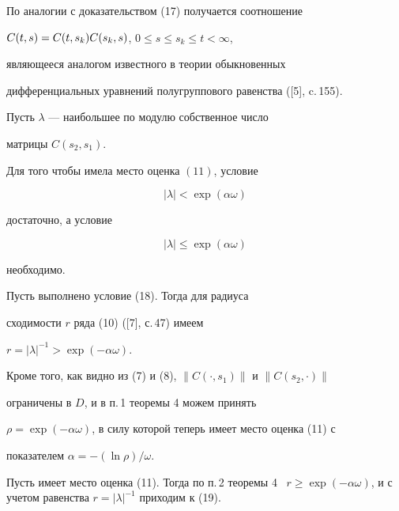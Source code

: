 \begin{notenonum}


По аналогии с доказательством (17) получается соотношение


$C(t,s)=\linebreak C(t,s_k)C(s_k,s)$, $0\le s\le s_k\le t<\infty$,


являющееся аналогом известного в теории обыкновенных


дифференциальных уравнений полугруппового равенства ([5], c.\,155).


\end{notenonum}





Пусть $\lambda$ --- наибольшее по модулю собственное число 


матрицы $C(s_2,s_1)$.





\begin{thm}


Для того чтобы имела место оценка $(11)$, условие


\begin{equation}


|\lambda|<\exp(\alpha\omega)


\end{equation}


достаточно, а условие


\begin{equation}


|\lambda|\le \exp(\alpha\omega)


\end{equation}


необходимо.


\end{thm}





\begin{pf}


Пусть выполнено условие (18). Тогда для радиуса


сходимости $r$ ряда (10)  ([7], с.\,47) имеем


$r=|\lambda|^{-1}>\exp(-\alpha\omega)$.


Кроме того, как видно из (7) и (8), $\|C(\cdot,s_1)\|$ и $\|C(s_2,\cdot)\|$


ограничены в $D$, и в п.\,1 теоремы 4 можем принять


$\rho=\exp(-\alpha\omega)$, в силу которой теперь имеет место оценка (11) с


показателем $\alpha=-(\ln\rho)/\omega$.





Пусть имеет место оценка  (11). Тогда по п.\,2 теоремы 4 \ $r\ge \exp(-\alpha


\omega)$, и с учетом равенства $r=|\lambda|^{-1}$ приходим к (19).


\end{pf}





